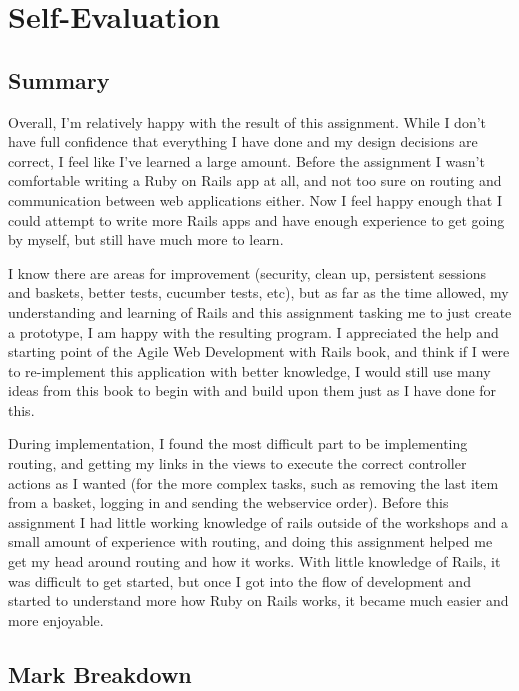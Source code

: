 \documentclass[12pt]{article}
\begin{document}

\section{Self-Evaluation}

\subsection{Summary}
Overall, I'm relatively happy with the result of this assignment. While I don't have full confidence that everything I have done and my design decisions are correct, I feel like I've learned a large amount. Before the assignment I wasn't comfortable writing a Ruby on Rails app at all, and not too sure on routing and communication between web applications either. Now I feel happy enough that I could attempt to write more Rails apps and have enough experience to get going by myself, but still have much more to learn.

I know there are areas for improvement (security, clean up, persistent sessions and baskets, better tests, cucumber tests, etc), but as far as the time allowed, my understanding and learning of Rails and this assignment tasking me to just create a prototype, I am happy with the resulting program. I appreciated the help and starting point of the Agile Web Development with Rails\cite{railsbook} book, and think if I were to re-implement this application with better knowledge, I would still use many ideas from this book to begin with and build upon them just as I have done for this.

During implementation, I found the most difficult part to be implementing routing, and getting my links in the views to execute the correct controller actions as I wanted (for the more complex tasks, such as removing the last item from a basket, logging in and sending the webservice order). Before this assignment I had little working knowledge of rails outside of the workshops and a small amount of experience with routing, and doing this assignment helped me get my head around routing and how it works. With little knowledge of Rails, it was difficult to get started, but once I got into the flow of development and started to understand more how Ruby on Rails works, it became much easier and more enjoyable. 

\subsection{Mark Breakdown}
\end{document}
